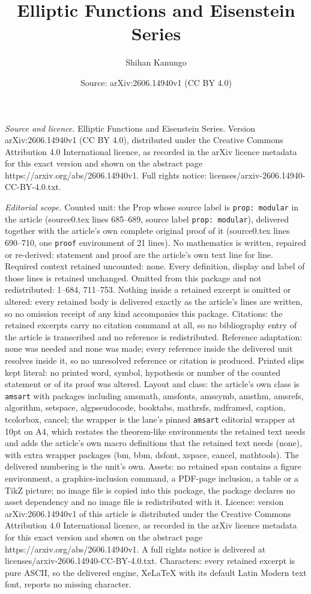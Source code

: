 \documentclass[10pt,a4paper]{amsart}
\title[Elliptic Functions and Eisenstein Series]{Elliptic Functions and Eisenstein Series}
\author{Shihan Kanungo}
\date{Source: arXiv:2606.14940v1 (CC BY 4.0)}
\begin{document}
\maketitle

\noindent\emph{Source and licence.} Elliptic Functions and Eisenstein Series. Version arXiv:2606.14940v1 (CC BY 4.0), distributed under the Creative Commons Attribution 4.0 International licence, as recorded in the arXiv licence metadata for this exact version and shown on the abstract page https://arxiv.org/abs/2606.14940v1. Full rights notice: licenses/arxiv-2606.14940-CC-BY-4.0.txt.\par\smallskip

\noindent\textit{Editorial scope.} Counted unit: the Prop whose source label is \texttt{prop: modular} in the article (source0.tex lines 685--689, source label \texttt{prop: modular}), delivered together with the article's own complete original proof of it (source0.tex lines 690--710, one \texttt{proof} environment of 21 lines). No mathematics is written, repaired or re-derived: statement and proof are the article's own text line for line. Required context retained uncounted: none. Every definition, display and label of those lines is retained unchanged. Omitted from this package and not redistributed: 1--684, 711--753. Nothing inside a retained excerpt is omitted or altered: every retained body is delivered exactly as the article's lines are written, so no omission receipt of any kind accompanies this package. Citations: the retained excerpts carry no citation command at all, so no bibliography entry of the article is transcribed and no reference is redistributed. Reference adaptation: none was needed and none was made; every reference inside the delivered unit resolves inside it, so no unresolved reference or citation is produced. Printed slips kept literal: no printed word, symbol, hypothesis or number of the counted statement or of its proof was altered. Layout and class: the article's own class is \texttt{amsart} with packages including amsmath, amsfonts, amssymb, amsthm, amsrefs, algorithm, setspace, algpseudocode, booktabs, mathrsfs, mdframed, caption, tcolorbox, cancel; the wrapper is the lane's pinned \texttt{amsart} editorial wrapper at 10pt on A4, which restates the theorem-like environments the retained text needs and adds the article's own macro definitions that the retained text needs (none), with extra wrapper packages (bm, bbm, dsfont, xspace, cancel, mathtools). The delivered numbering is the unit's own. Assets: no retained span contains a figure environment, a graphics-inclusion command, a PDF-page inclusion, a table or a TikZ picture; no image file is copied into this package, the package declares no asset dependency and no image file is redistributed with it. Licence: version arXiv:2606.14940v1 of this article is distributed under the Creative Commons Attribution 4.0 International licence, as recorded in the arXiv licence metadata for this exact version and shown on the abstract page https://arxiv.org/abs/2606.14940v1. A full rights notice is delivered at licenses/arxiv-2606.14940-CC-BY-4.0.txt. Characters: every retained excerpt is pure ASCII, so the delivered engine, XeLaTeX with its default Latin Modern text font, reports no missing character.
\end{document}
